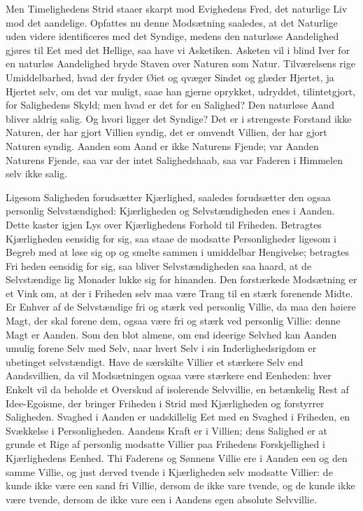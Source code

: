 \documentclass[12pt]{book}
\begin{document}
Men Timelighedens Strid staaer skarpt mod Evighedens Fred, det
naturlige Liv mod det aandelige. Opfattes nu denne Modsætning
saaledes, at det Naturlige uden videre identificeres med det
Syndige, medens den naturløse Aandelighed gjøres til Eet med det
Hellige, saa have vi Asketiken. Asketen vil i blind Iver for en
naturløs Aandelighed bryde Staven over Naturen som Natur.
Tilværelsens rige Umiddelbarhed, hvad der fryder Øiet og qvæger
Sindet og glæder Hjertet, ja Hjertet selv, om det var muligt, saae
han gjerne oprykket, udryddet, tilintetgjort, for Salighedens Skyld;
men hvad er det for en Salighed? Den naturløse Aand bliver aldrig
salig. Og hvori ligger det Syndige? Det er i strengeste Forstand
ikke Naturen, der har gjort Villien syndig, det er omvendt Villien,
der har gjort Naturen syndig. Aanden som Aand er ikke Naturens
Fjende; var Aanden Naturens Fjende, saa var der intet Salighedshaab,
saa var Faderen i Himmelen selv ikke salig.

Ligesom Saligheden forudsætter Kjærlighed, saaledes forudsætter den
ogsaa personlig Selvstændighed: Kjærligheden og Selvstændigheden
enes i Aanden. Dette kaster igjen Lys over Kjærlighedens Forhold til
Friheden. Betragtes Kjærligheden eensidig for sig, saa staae de
modsatte Personligheder ligesom i Begreb med at løse sig op og
smelte sammen i umiddelbar Hengivelse; betragtes Fri\-
heden eensidig for sig, saa bliver Selvstændigheden saa haard, at de
Selvstændige lig Monader lukke sig for hinanden. Den forstærkede
Modsætning er et Vink om, at der i Friheden selv maa være Trang til
en stærk forenende Midte. Er Enhver af de Selvstændige fri og stærk
ved personlig Villie, da maa den høiere Magt, der skal forene dem,
ogsaa være fri og stærk ved personlig Villie: denne Magt er Aanden.
Som den blot almene, om end ideerige Selvhed kan Aanden umulig
forene Selv med Selv, naar hvert Selv i sin Inderlighedsrigdom er
ubetinget selvstændigt. Have de særskilte Villier et stærkere Selv
end Aandsvillien, da vil Modsætningen ogsaa være stærkere end
Eenheden: hver Enkelt vil da beholde et Overskud af isolerende
Selvvillie, en betænkelig Rest af Idee-Egoisme, der bringer Friheden
i Strid med Kjærligheden og forstyrrer Saligheden. Svaghed i Aanden
er uadskillelig Eet med en Svaghed i Friheden, en Svækkelse i
Personligheden. Aandens Kraft er i Villien; dens Salighed er at
grunde et Rige af personlig modsatte Villier paa Frihedens
Forskjellighed i Kjærlighedens Eenhed. Thi Faderens og Sønnens
Villie ere i Aanden een og den samme Villie, og just derved tvende i
Kjærligheden selv modsatte Villier: de kunde ikke være een sand fri
Villie, dersom de ikke vare tvende, og de kunde ikke være tvende,
dersom de ikke vare een i Aandens egen absolute Selvvillie.
\end{document}
